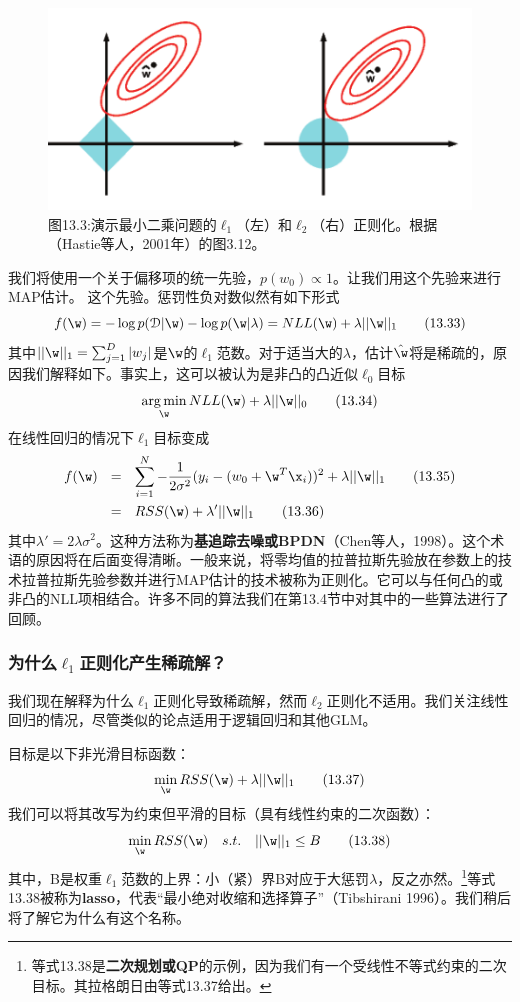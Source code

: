 \documentclass[a4paper]{article}
\DeclareMathOperator*{\argmin}{arg\,min}
\begin{document}
\begin{figure}[h]
	\centering
	\includegraphics[width=0.7\linewidth]{fig13/figure3}
	\caption*{图13.3:演示最小二乘问题的$\ell_1$（左）和$\ell_2$（右）正则化。根据（Hastie等人，2001年）的图3.12。}
\end{figure}
我们将使用一个关于偏移项的统一先验，$p(w_0)\propto 1$。让我们用这个先验来进行MAP估计。
这个先验。惩罚性负对数似然有如下形式
\begin{equation}
	f(\w)=-\log p(\mathcal{D}|\w)-\log p(\w|\lambda)=NLL(\w)+\lambda||\w||_1\tag{13.33}
\end{equation}
其中$||\w||_1=\sum\nolimits_{j=1}^D|w_j|$是$\w$的$\ell_1$范数。对于适当大的$\lambda$，估计$\hat{\w}$将是稀疏的，原因我们解释如下。事实上，这可以被认为是非凸的凸近似$\ell_0$目标
\begin{equation}
	\argmin_\w NLL(\w)+\lambda||\w||_0\tag{13.34}
\end{equation}
在线性回归的情况下$\ell_1$目标变成
\begin{align}
	f(\w)\ \ &=\ \ \sum_{i=1}^{N}-\frac{1}{2\sigma^2}(y_i-(w_0+\w^T\x_i))^2+\lambda||\w||_1\tag{13.35}\\
	&=\ \ RSS(\w)+\lambda'||\w||_1\tag{13.36}
\end{align}
其中$\lambda'=2\lambda\sigma^2$。这种方法称为\textbf{基追踪去噪或BPDN}（Chen等人，1998）。这个术语的原因将在后面变得清晰。一般来说，将零均值的拉普拉斯先验放在参数上的技术拉普拉斯先验参数并进行MAP估计的技术被称为正则化。它可以与任何凸的或非凸的NLL项相结合。许多不同的算法我们在第13.4节中对其中的一些算法进行了回顾。

\subsubsection{为什么$\ell_1$正则化产生稀疏解？}
我们现在解释为什么$\ell_1$正则化导致稀疏解，然而$\ell_2$正则化不适用。我们关注线性回归的情况，尽管类似的论点适用于逻辑回归和其他GLM。

目标是以下非光滑目标函数：
\begin{equation}
	\min_\w RSS(\w)+\lambda||\w||_1\tag{13.37}
\end{equation}
我们可以将其改写为约束但平滑的目标（具有线性约束的二次函数）：
\begin{equation}
\min_\w RSS(\w)\ \ \ s.t.\ \ \ ||\w||_1\le B\tag{13.38}
\end{equation}
其中，B是权重$\ell_1$范数的上界：小（紧）界B对应于大惩罚$\lambda$，反之亦然。\footnote{等式13.38是\textbf{二次规划或QP}的示例，因为我们有一个受线性不等式约束的二次目标。其拉格朗日由等式13.37给出。}等式13.38被称为\textbf{lasso}，代表“最小绝对收缩和选择算子”（Tibshirani 1996）。我们稍后将了解它为什么有这个名称。
\end{document}
